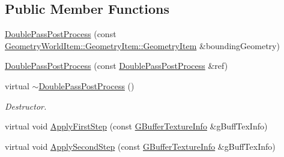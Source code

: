 \subsection*{Public Member Functions}
\begin{DoxyCompactItemize}
\item 
\mbox{\hyperlink{class_geometry_engine_1_1_geometry_post_process_1_1_double_pass_post_process_1_1_double_pass_post_process_aacc7fc7eca98dbfa500035cbacbea78b}{Double\+Pass\+Post\+Process}} (const \mbox{\hyperlink{class_geometry_engine_1_1_geometry_world_item_1_1_geometry_item_1_1_geometry_item}{Geometry\+World\+Item\+::\+Geometry\+Item\+::\+Geometry\+Item}} \&bounding\+Geometry)
\item 
\mbox{\hyperlink{class_geometry_engine_1_1_geometry_post_process_1_1_double_pass_post_process_1_1_double_pass_post_process_acf262889c6fddc54ee4daf2015c2a69f}{Double\+Pass\+Post\+Process}} (const \mbox{\hyperlink{class_geometry_engine_1_1_geometry_post_process_1_1_double_pass_post_process_1_1_double_pass_post_process}{Double\+Pass\+Post\+Process}} \&ref)
\item 
\mbox{\label{class_geometry_engine_1_1_geometry_post_process_1_1_double_pass_post_process_1_1_double_pass_post_process_ae50b64dabbe90930bffb4976785021ed}} 
virtual \mbox{\hyperlink{class_geometry_engine_1_1_geometry_post_process_1_1_double_pass_post_process_1_1_double_pass_post_process_ae50b64dabbe90930bffb4976785021ed}{$\sim$\+Double\+Pass\+Post\+Process}} ()
\begin{DoxyCompactList}\small\item\em Destructor. \end{DoxyCompactList}\item 
virtual void \mbox{\hyperlink{class_geometry_engine_1_1_geometry_post_process_1_1_double_pass_post_process_1_1_double_pass_post_process_a1e32828640812e382cdd1b66207c88ee}{Apply\+First\+Step}} (const \mbox{\hyperlink{struct_geometry_engine_1_1_g_buffer_texture_info}{G\+Buffer\+Texture\+Info}} \&g\+Buff\+Tex\+Info)
\item 
virtual void \mbox{\hyperlink{class_geometry_engine_1_1_geometry_post_process_1_1_double_pass_post_process_1_1_double_pass_post_process_a1e153685f0d82ca6fdb913d234fd3370}{Apply\+Second\+Step}} (const \mbox{\hyperlink{struct_geometry_engine_1_1_g_buffer_texture_info}{G\+Buffer\+Texture\+Info}} \&g\+Buff\+Tex\+Info)
\end{DoxyCompactItemize}
